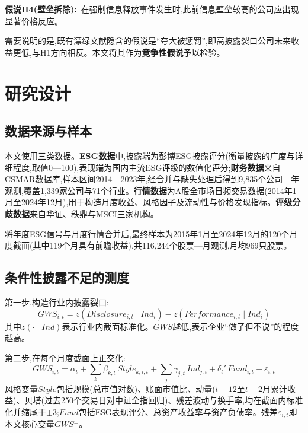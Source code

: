 \documentclass[UTF8, a4paper, fontset=fandol, zihao=-4]{ctexart}
\begin{document}
\vspace{2pt}
\noindent\textbf{假说H4(壁垒拆除):}~在强制信息释放事件发生时,此前信息壁垒较高的公司应出现显著价格反应。

\vspace{2pt}
需要说明的是,既有漂绿文献隐含的假说是“夸大被惩罚”,即高披露裂口公司未来收益更低,与H1方向相反。本文将其作为\textbf{竞争性假说}予以检验。

\section{研究设计}

\subsection{数据来源与样本}

本文使用三类数据。\textbf{ESG数据}中,披露端为彭博ESG披露评分(衡量披露的广度与详细程度,取值0—100),表现端为国内主流ESG评级的数值化评分;\textbf{财务数据}来自CSMAR数据库,样本区间2014—2023年,经合并与缺失处理后得到9{,}835个公司—年观测,覆盖1{,}339家公司与71个行业。\textbf{行情数据}为A股全市场日频交易数据(2014年1月至2024年12月),用于构造月度收益、风格因子及流动性与价格发现指标。\textbf{评级分歧数据}来自华证、秩鼎与MSCI三家机构。

将年度ESG信号与月度行情合并后,最终样本为2015年1月至2024年12月的120个月度截面(其中119个月具有前瞻收益),共116{,}244个股票—月观测,月均969只股票。

\subsection{条件性披露不足的测度}

第一步,构造行业内披露裂口:
\begin{equation}
GWS_{i,t} = z\!\left(Disclosure_{i,t}\mid Ind_i\right) - z\!\left(Performance_{i,t}\mid Ind_i\right)
\end{equation}
其中$z(\cdot\mid Ind)$表示行业内截面标准化。$GWS$越低,表示企业“做了但不说”的程度越高。

第二步,在每个月度截面上正交化:
\begin{equation}
GWS_{i,t} = \alpha_t + \sum_k \beta_{k,t}\,Style_{k,i,t} + \sum_j \gamma_{j,t}\,Ind_{j,i} + \delta_t'\,Fund_{i,t} + \varepsilon_{i,t}
\end{equation}
风格变量$Style$包括规模(总市值对数)、账面市值比、动量($t-12$至$t-2$月累计收益)、贝塔(过去250个交易日对中证全指回归)、残差波动与换手率,均在截面内标准化并缩尾于$\pm 3$;$Fund$包括ESG表现评分、总资产收益率与资产负债率。残差$\varepsilon_{i,t}$即本文核心变量$GWS^{\perp}$。
\end{document}
